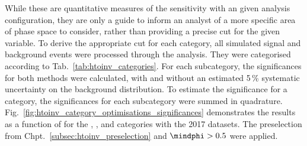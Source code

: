 While these are quantitative measures of the sensitivity with an given analysis configuration, they are only a guide to inform an analyst of a more specific area of phase space to consider, rather than providing a precise cut for the given variable. To derive the appropriate cut for each category, all simulated signal and background events were processed through the analysis. They were categorised according to Tab.~\ref{tab:htoinv_categories}. For each subcategory, the significances for both methods were calculated, with and without an estimated 5\,\% systematic uncertainty on the background distribution. To estimate the significance for a category, the significances for each subcategory were summed in quadrature. Fig.~\ref{fig:htoinv_category_optimisations_significances} demonstrates the results as a function of \omegaTilde for the \ttH, \VH, and \ggH categories with the 2017 datasets. The preselection from Chpt.~\ref{subsec:htoinv_preselection} and $\mindphi > \text{0.5}$ were applied.

